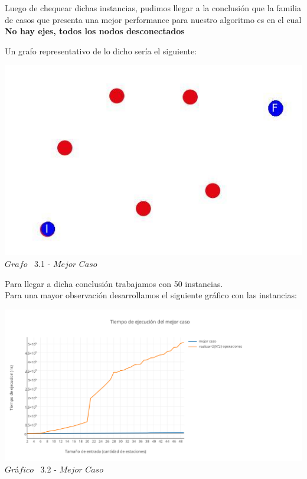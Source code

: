 Luego de chequear dichas instancias, pudimos llegar a la conclusi\'on que la familia de casos que presenta una mejor performance para nuestro algoritmo
es en el cual \textbf{No hay ejes, todos los nodos desconectados}

Un grafo representativo de lo dicho ser\'ia el siguiente:

\vspace*{0.3cm} \vspace*{0.3cm}
  \begin{center}
\includegraphics[scale=0.5]{./EJ3/grafoSinEjes.jpeg}
\\{$Grafo$ \ 3.1 - $Mejor$ $Caso$} 
  \end{center}
  \vspace*{0.3cm}
  
Para llegar a dicha conclusi\'on trabajamos con 50 instancias.\\

Para una mayor observaci\'on desarrollamos el siguiente gr\'afico con las instancias:\\

\vspace*{0.3cm} \vspace*{0.3cm}
  \begin{center}
 \includegraphics[scale=0.65]{./EJ3/mejorcaso.png}
 {$Gr$\'a$fico$ \ 3.2 - $Mejor$ $Caso$}
  \end{center}
  \vspace*{0.3cm}
  
